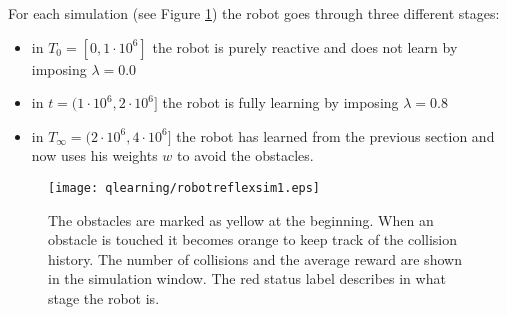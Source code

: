For each simulation (see Figure \ref{fig:qlearning:robot-sim1}) the robot goes
through three different stages:
\begin{itemize}
 \item in $T_0=[0,1\cdot 10^6]$ the robot is purely reactive and does not learn by
imposing $\lambda=0.0$
 \item in $t=(1\cdot  10^6, 2 \cdot  10^6]$ the robot is fully learning by
imposing $\lambda=0.8$
 \item in $T_\infty=(2 \cdot  10^6, 4 \cdot  10^6]$ the robot has learned from the previous
section and now uses his weights $w$ to avoid the obstacles.
\end{itemize}

\begin{figure}[tbp]
\begin{center}
\texttt{[image: qlearning/robotreflexsim1.eps]}
\end{center}
\small{
\caption[Q learning environment]{The obstacles are marked as yellow at the beginning.
When an obstacle is touched it becomes orange to keep track of the collision history.
The number of collisions and the average reward are shown in the simulation window.
The red status label describes in what stage the robot is.
 \label{fig:qlearning:robot-sim1}}}
\end{figure}

